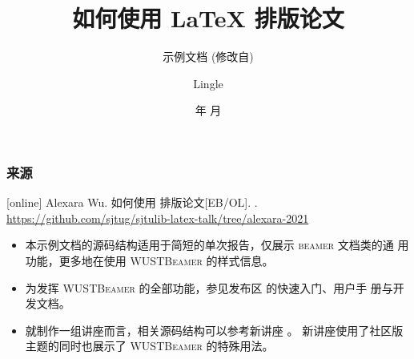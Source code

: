 \documentclass[xcolor=table,dvipsnames,svgnames,aspectratio=169]{ctexbeamer}
\author{Lingle}
\institute[WUST]{武汉科技大学 \\ 资源与环境工程学院}
\date{\the\year 年 \the\month 月}
\title[\WUSTBeamer 示例文档] %
{\textbf{如何使用 \LaTeX{} 排版论文}} %
\subtitle{\WUSTBeamer 示例文档 (修改自\SJTUBeamer)}
\renewcommand{\LaTeX}{\hologo{LaTeX}}
\newcommand{\beamer}{\textsc{beamer}}
\newcommand{\WUSTBeamer}{\textsc{WUSTBeamer}}
\newcommand\link[1]{\href{#1}{\faLink}}
\begin{document}




\AtBeginSection[]{
  \begin{frame}
    \tableofcontents[currentsection,subsectionstyle=show/show/hide]
  \end{frame}
}

\AtBeginSubsection[]{		       %
  \begin{frame}
    \tableofcontents[currentsection,subsectionstyle=show/shaded/hide]
  \end{frame}
}

\maketitle

\begin{frame}
  \frametitle{来源}
  \begin{thebibliography}{00}
    [online]
    \bibitem{} Alexara Wu.
    \newblock 如何使用 \LaTeX{} 排版论文[EB/OL].
    .
    \url{https://github.com/sjtug/sjtulib-latex-talk/tree/alexara-2021}
  \end{thebibliography}

  \vspace*{2ex}

  \begin{itemize}
    \item 本示例文档的源码结构适用于简短的单次报告，仅展示 \beamer{} 文档类的通
          用功能，更多地在使用 \WUSTBeamer{} 的样式信息。
    \item 为发挥 \WUSTBeamer{} 的全部功能，参见发布区
          \link{https://github.com/sjtug/WUSTBeamer/releases} 的快速入门、用户手
          册与开发文档。
    \item 就制作一组讲座而言，相关源码结构可以参考新讲座
          \link{https://github.com/sjtug/sjtulib-latex-talk/tree/logcreative-2022}。
          新讲座使用了社区版主题的同时也展示了 \WUSTBeamer{} 的特殊用法。
  \end{itemize}

\end{frame}
\end{document}
